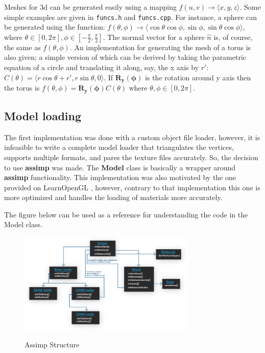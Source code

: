 Meshes for 3d can be generated easily using a mapping $f (u, v)\rightarrow 
\langle x, y, z \rangle$. Some simple examples are given in \texttt{funcs.h} and \texttt{funcs.cpp}. For instance, a sphere can be generated using the function: $f (\theta, \phi) \rightarrow \langle \cos\theta\cos\phi, \sin\phi, \sin\theta\cos\phi \rangle$, where $\theta \in [0, 2\pi], \phi \in [-\frac{\pi}{2}, \frac{\pi}{2}]$. The normal vector for a sphere $\hat{n}$ is, of course, the same as $f (\theta, \phi)$. An implementation for generating the mesh of a torus is also given; a simple version of which can be derived by taking the parametric equation of a circle and translating it along, say, the x axis by $r\prime$: $C (\theta) = \langle r\cos\theta+r\prime, r\sin\theta, 0 \rangle$. If $\mathbf{R_y (\phi)}$ is the rotation around y axis then the torus is $f (\theta, \phi) = \mathbf{R_y( \phi)}C( \theta)$ where $\theta, \phi \in [0, 2\pi]$.


\subsection{Model loading}
The first implementation was done with a custom object file loader, however, it is infeasible to write a complete model loader that triangulates the vertices, supports multiple formats, and pares the texture files accurately. So, the decision to use \textbf{assimp} was made. The \textbf{Model} class is basically a wrapper around \textbf{assimp} functionality. This implementation was also motivated by the one provided on LearnOpenGL \cite{learnopengl}, however, contrary to that implementation this one is more optimized and handles the loading of materials more accurately.

The figure below can be used as a reference for understanding the code in the Model class.
\begin{figure}[H]
    \centering
    \includegraphics[width=0.75\textwidth]{images/assimp_structure.png}
    \caption{Assimp Structure} \cite{learnopengl}
    \label{fig:assimp_structure}
\end{figure}


